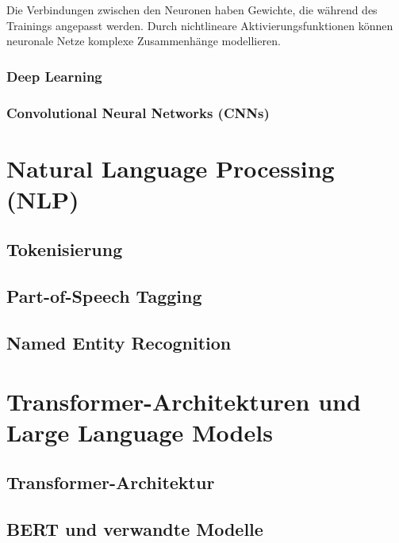 Die Verbindungen zwischen den Neuronen haben Gewichte, die während des Trainings angepasst werden. Durch nichtlineare Aktivierungsfunktionen können neuronale Netze komplexe Zusammenhänge modellieren.

\subsubsection{Deep Learning}
\label{subsec:deep-learning}

\subsubsection{Convolutional Neural Networks (CNNs)}
\label{subsubsec:cnn}

\section{Natural Language Processing (NLP)}
\label{sec:nlp}

\subsection{Tokenisierung}
\label{subsec:tokenisierung}

\subsection{Part-of-Speech Tagging}
\label{subsec:pos-tagging}

\subsection{Named Entity Recognition}
\label{subsec:ner}

\section{Transformer-Architekturen und Large Language Models}
\label{sec:transformers-llms}

\subsection{Transformer-Architektur}
\label{subsec:transformer-architecture}

\subsection{BERT und verwandte Modelle}
\label{subsec:bert}

